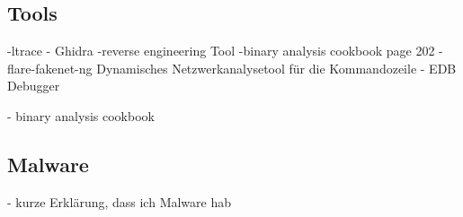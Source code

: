 \begin{otherlanguage}{ngerman}
\subsection{Tools}
-ltrace
\newline
- Ghidra
\newline
-reverse engineering Tool
\newline
-binary analysis cookbook page 202
\newline
- flare-fakenet-ng
\newline
Dynamisches Netzwerkanalysetool für die Kommandozeile
\newline
- EDB Debugger




\newline 
- binary analysis cookbook  
\subsection{Malware}
- kurze Erklärung, dass ich Malware hab
\newpage
\end{otherlanguage}